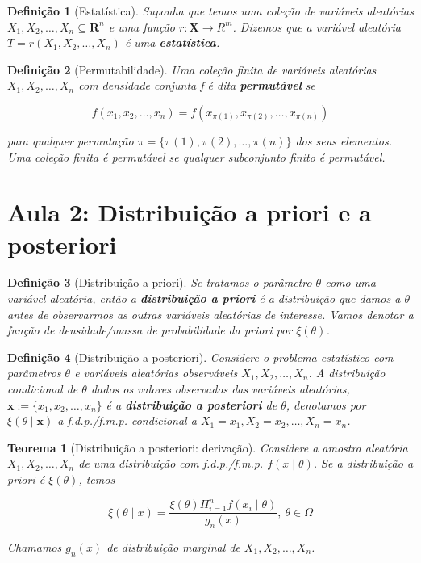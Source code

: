 \documentclass{article}
\newtheorem{theorem}{Teorema}
\newtheorem{definition}{Definição}
\begin{document}
\begin{definition}[Estatística]
Suponha que temos uma coleção de variáveis aleatórias $X_1, X_2, \ldots, X_n \subseteq \mathbf{R}^n$ e uma função $r: \mathbf{X} \rightarrow R^m$. Dizemos que a variável aleatória $T = r(X_1, X_2, \ldots, X_n)$ é uma \textbf{estatística}.
\end{definition}

\begin{definition}[Permutabilidade]
Uma coleção finita de variáveis aleatórias $X_1, X_2, \ldots, X_n$ com densidade conjunta f é dita \textbf{permutável} se

\begin{equation}
f(x_1, x_2, \ldots, x_n) = f(x_{\pi(1)}, x_{\pi(2)}, \ldots, x_{\pi(n)})
\end{equation}

para qualquer permutação $\pi = \{\pi(1), \pi(2), \ldots, \pi(n)\}$ dos seus elementos. Uma coleção finita é permutável se qualquer subconjunto finito é permutável.
\end{definition}

\section*{Aula 2:  Distribuição a priori e a posteriori}
\begin{definition}[Distribuição a priori]
Se tratamos o parâmetro $\theta$ como uma variável aleatória, então a \textbf{distribuição a priori} é a distribuição que damos a $\theta$ antes de observarmos as outras variáveis aleatórias de interesse. Vamos denotar a função de densidade/massa de probabilidade da priori por $\xi(\theta)$.
\end{definition}

\begin{definition}[Distribuição a posteriori]
Considere o problema estatístico com parâmetros $\theta$ e variáveis aleatórias observáveis $X_1, X_2, \ldots, X_n$. A distribuição condicional de $\theta$ dados os valores observados das variáveis aleatórias, $\textbf{x} := \{x_1, x_2, \ldots, x_n\}$ é a \textbf{distribuição a posteriori} de $\theta$, denotamos por $\xi(\theta \mid \textbf{x})$ a f.d.p./f.m.p. condicional a $X_1 = x_1, X_2 = x_2, \ldots, X_n = x_n$.
\end{definition}

\begin{theorem}[Distribuição a posteriori: derivação]
Considere a amostra aleatória $X_1, X_2, \ldots, X_n$ de uma distribuição com f.d.p./f.m.p. $f(x \mid \theta)$. Se a distribuição a priori é $\xi(\theta)$, temos

\begin{equation}
\xi(\theta \mid x) = \frac{\xi(\theta) \Pi_{i = 1}^{n} f(x_i \mid \theta)}{g_n(x)}, \ \theta \in \Omega
\end{equation}

Chamamos $g_n(x)$ de distribuição marginal de $X_1, X_2, \ldots, X_n$.
\end{theorem}
\end{document}
